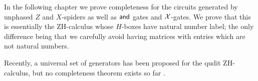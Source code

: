 
In the following chapter we prove completeness for the circuits generated by unphased $Z$ and $X$-spiders as well as ${\sf and}$ gates and $\cal X$-gates.  We prove that this is essentially the ZH-calculus whose $H$-boxes have natural number label; the only difference being that we carefully avoid having matrices with entries which are not natural numbers.

Recently, a universal set of generators has been proposed for the qudit ZH-calculus, but no completeness theorem exists so far \cite{roy}.




%
%
%
